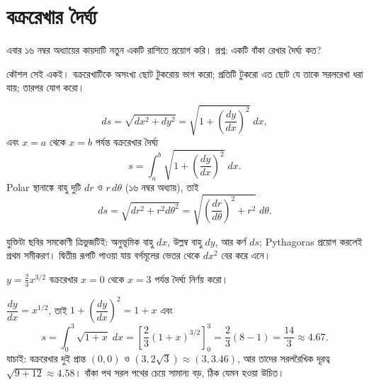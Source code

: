 \documentclass[11pt]{article}
\begin{document}
\section{বক্ররেখার দৈর্ঘ্য}

এবার ১৬ নম্বর অধ্যায়ের কায়দাটি নতুন একটি রাশিতে প্রয়োগ করি। প্রশ্ন:
একটি বাঁকা রেখার দৈর্ঘ্য কত?

কৌশল সেই একই। বক্ররেখাটিকে অসংখ্য ছোট টুকরোয় ভাগ করো; প্রতিটি টুকরো এত ছোট যে
তাকে সরলরেখা ধরা যায়; তারপর যোগ করো।

\begin{center}
\end{center}

\begin{idea}[চাপের উপাদান]
\[
  ds = \sqrt{dx^{2} + dy^{2}}
     = \sqrt{1 + \left( \frac{dy}{dx} \right)^{2}}\;dx ,
\]
এবং $x = a$ থেকে $x = b$ পর্যন্ত বক্ররেখার দৈর্ঘ্য
\[
  s = \int_{a}^{b}\sqrt{1 + \left( \frac{dy}{dx} \right)^{2}}\;dx .
\]
Polar স্থানাঙ্কে বাহু দুটি $dr$ ও $r\,d\theta$ (১৬ নম্বর অধ্যায়), তাই
\[
  ds = \sqrt{dr^{2} + r^{2}d\theta^{2}}
     = \sqrt{\left( \frac{dr}{d\theta} \right)^{2} + r^{2}}\;d\theta .
\]
\end{idea}

যুক্তিটা ছবির সমকোণী ত্রিভুজটিই: অনুভূমিক বাহু $dx$, উল্লম্ব বাহু $dy$, আর
কর্ণ $ds$; Pythagoras প্রয়োগ করলেই প্রথম সমীকরণ। দ্বিতীয় রূপটি পাওয়া যায়
বর্গমূলের ভেতর থেকে $dx^{2}$ বের করে এনে।


\begin{example}
$y = \tfrac{2}{3}x^{3/2}$ বক্ররেখার $x=0$ থেকে $x=3$ পর্যন্ত দৈর্ঘ্য নির্ণয়
করো।
\end{example}

\begin{solbox}
$\dfrac{dy}{dx} = x^{1/2}$, তাই $1 + \left( \dfrac{dy}{dx} \right)^{2}
= 1 + x$ এবং
\[
  s = \int_{0}^{3}\sqrt{1+x}\;dx
    = \left[ \frac{2}{3}(1+x)^{3/2} \right]_{0}^{3}
    = \frac{2}{3}\left( 8 - 1 \right) = \frac{14}{3} \approx 4.67 .
\]
যাচাই: বক্ররেখার দুই প্রান্ত $(0,0)$ ও $(3, 2\sqrt{3}) \approx (3, 3.46)$, আর
তাদের সরলরৈখিক দূরত্ব $\sqrt{9+12} \approx 4.58$। বাঁকা পথ সরল পথের চেয়ে
সামান্য বড়, ঠিক যেমন হওয়া উচিত।
\end{solbox}
\end{document}
